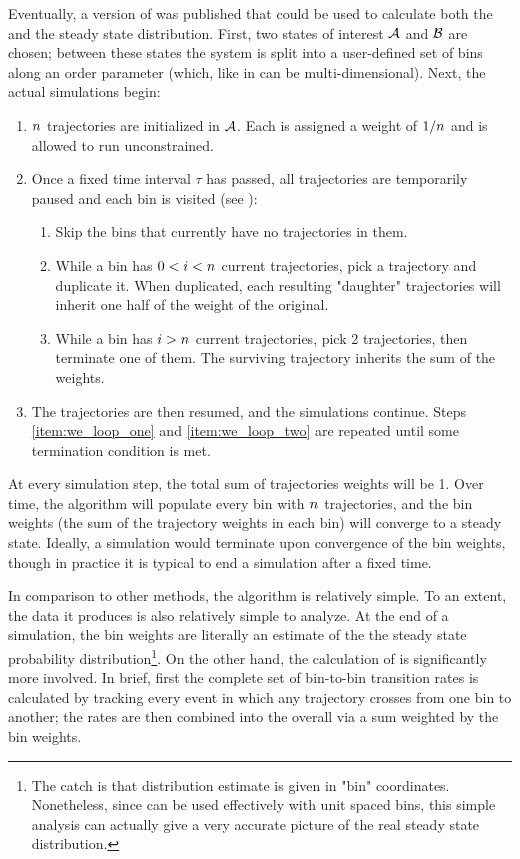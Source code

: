 Eventually, a version of  was published that could be used to calculate both the  and the steady state distribution\supercite{Donovan:2013gz}. First, two states of interest $\mathcal{A}$ and $\mathcal{B}$ are chosen; between these states the system is split into a user-defined set of bins along an order parameter (which, like in  can be multi-dimensional). Next, the actual simulations begin:
\begin{enumerate}
    \item $n_{}$ trajectories are initialized in $\mathcal{A}$. Each is assigned a weight of $1/n_{}$ and is allowed to run unconstrained.
    \item\label{item:we_loop_one} Once a fixed time interval $\tau$ has passed, all trajectories are temporarily paused and each bin is visited (see ):
    \begin{enumerate}
        \item Skip the bins that currently have no trajectories in them.
        \item While a bin has $0 < i < n_{}$ current trajectories, pick a trajectory and duplicate it. When duplicated, each resulting "daughter" trajectories will inherit one half of the weight of the original.
        \item While a bin has $i > n_{}$ current trajectories, pick 2 trajectories, then terminate one of them. The surviving trajectory inherits the sum of the weights.
    \end{enumerate}
    \item\label{item:we_loop_two} The trajectories are then resumed, and the simulations continue. Steps \ref{item:we_loop_one} and \ref{item:we_loop_two} are repeated until some termination condition is met.
\end{enumerate}
At every simulation step, the total sum of trajectories weights will be 1. Over time, the  algorithm will populate every bin with $n_{}$ trajectories, and the bin weights (\ie the sum of the trajectory weights in each bin) will converge to a steady state. Ideally, a  simulation would terminate upon convergence of the bin weights, though in practice it is typical to end a simulation after a fixed time.

In comparison to other  methods, the  algorithm is relatively simple. To an extent, the data it produces is also relatively simple to analyze. At the end of a  simulation, the bin weights are literally an estimate of the the steady state probability distribution\footnote{The catch is that distribution estimate is given in "bin" coordinates. Nonetheless, since  can be used effectively with unit spaced bins\supercite{Zhang:2010kfa}, this simple analysis can actually give a very accurate picture of the real steady state distribution.}. On the other hand, the calculation of  is significantly more involved. In brief, first the complete set of bin-to-bin transition rates is calculated by tracking every event in which any trajectory crosses from one bin to another; the rates are then combined into the overall  via a sum weighted by the bin weights\supercite{Donovan:2013gz,Adelman:2013ii,Feng:2015gl}.

